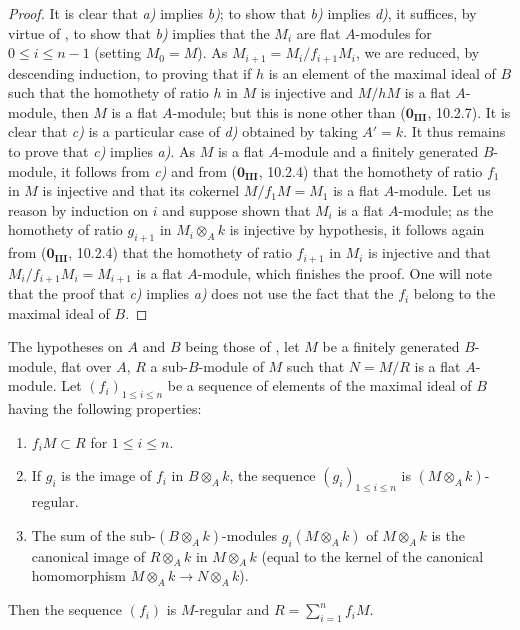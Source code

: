 \begin{proof}
It is clear that \emph{a)} implies \emph{b)};
to show that \emph{b)} implies \emph{d)}, it suffices, by virtue of , to show that \emph{b)} implies that the $M_i$ are flat $A$-modules for $0\leq i\leq n-1$ (setting $M_0=M$).
As $M_{i+1}=M_i/f_{i+1}M_i$, we are reduced, by descending induction, to proving that if $h$ is an element of the maximal ideal of $B$ such that the homothety of ratio $h$ in $M$ is injective and $M/hM$ is a flat $A$-module, then $M$ is a flat $A$-module;
but this is none other than ($\mathbf{0_{III}}$, 10.2.7).
It is clear that \emph{c)} is a particular case of \emph{d)} obtained by taking $A'=k$.
It thus remains to prove that \emph{c)} implies \emph{a)}.
As $M$ is a flat $A$-module and a finitely generated $B$-module, it follows from \emph{c)} and from ($\mathbf{0_{III}}$, 10.2.4) that the homothety of ratio $f_1$ in $M$ is injective and that its cokernel $M/f_1M=M_1$ is a flat $A$-module.
Let us reason by induction on $i$ and suppose shown that $M_i$ is a flat $A$-module;
as the homothety of ratio $g_{i+1}$ in $M_i\otimes_Ak$ is injective by hypothesis, it follows again from ($\mathbf{0_{III}}$, 10.2.4) that the homothety of ratio $f_{i+1}$ in $M_i$ is injective and that $M_i/f_{i+1}M_i=M_{i+1}$ is a flat $A$-module, which finishes the proof.
One will note that the proof that \emph{c)} implies \emph{a)} does not use the fact that the $f_i$ belong to the maximal ideal of $B$.
\end{proof}

\begin{corollary}[15.1.17]
\label{0.15.1.17}
The hypotheses on $A$ and $B$ being those of , let $M$ be a finitely generated $B$-module, flat over $A$, $R$ a sub-$B$-module of $M$ such that $N=M/R$ is a flat $A$-module.
Let $(f_i)_{1\leq i\leq n}$ be a sequence of elements of the maximal ideal of $B$ having the following properties:
\begin{enumerate}
  \item[\textup{(i)}] $f_iM\subset R$ for $1\leq i\leq n$.
  \item[\textup{(ii)}] If $g_i$ is the image of $f_i$ in $B\otimes_Ak$, the sequence $(g_i)_{1\leq i\leq n}$ is $(M\otimes_Ak)$-regular.
  \item[\textup{(iii)}] The sum of the sub-$(B\otimes_Ak)$-modules $g_i(M\otimes_Ak)$ of $M\otimes_Ak$ is the canonical image of $R\otimes_Ak$ in $M\otimes_Ak$ (equal to the kernel of the canonical homomorphism $M\otimes_Ak\to N\otimes_Ak$).
\end{enumerate}
Then the sequence $(f_i)$ is $M$-regular and $R=\sum_{i=1}^n f_iM$.
\end{corollary}

